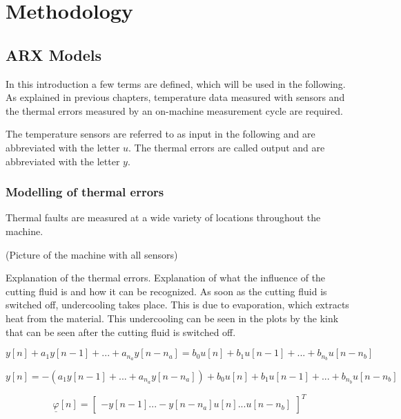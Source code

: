 \chapter{Methodology}
\label{chp:sample_chapter}



\section{ARX Models}
\label{sec:ARX_models}


In this introduction a few terms are defined, which will be used in the following. As explained in previous chapters, temperature data measured with sensors and the thermal errors measured by an on-machine measurement cycle are required.

The temperature sensors are referred to as input in the following and are abbreviated with the letter $u$. The thermal errors are called output and are abbreviated with the letter $y$. 

\subsection{Modelling of thermal errors}
\label{sec:modelling of errors}

Thermal faults are measured at a wide variety of locations throughout the machine. 

(Picture of the machine with all sensors)

Explanation of the thermal errors. Explanation of what the influence of the cutting fluid is and how it can be recognized. As soon as the cutting fluid is switched off, undercooling takes place. This is due to evaporation, which extracts heat from the material. This undercooling can be seen in the plots by the kink that can be seen after the cutting fluid is switched off.


 \begin{equation}
	y[n]+a_1y[n-1]+...+a_{n_a}y[n-n_a] = b_0 u[n]+b_1u[n-1]+...+b_{n_b} u[n-n_b]
	\label{eq:arx_eq}
\end{equation}



 \begin{equation}
	y[n] = -(a_1y[n-1]+...+a_{n_a}y[n-n_a]) + b_0 u[n]+b_1u[n-1]+...+b_{n_b} u[n-n_b]
	\label{eq:arx_eq_extendet}
\end{equation}


 \begin{equation}
 	\underline{\varphi}[n] = \begin{bmatrix}
		-y[n-1]...-y[n-n_a]  u[n]...u[n-n_b]
				\end{bmatrix}^T
	\label{eq:arx_eq_matix}
\end{equation}


